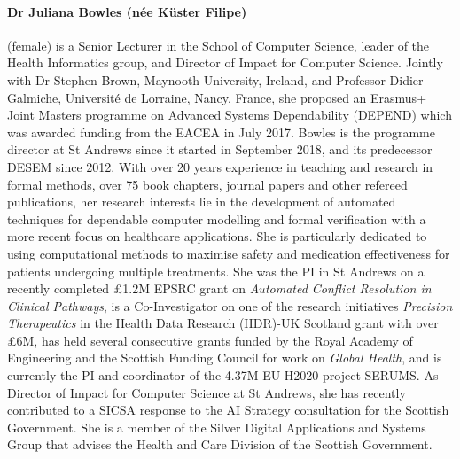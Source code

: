 \documentclass[a4paper,11pt]{article}
\begin{document}
\paragraph{Dr Juliana Bowles (n\'ee K\"uster Filipe)} (female) 
is  a Senior Lecturer in the School of Computer Science, leader of the Health Informatics group, and Director of Impact for Computer Science. 
Jointly with Dr Stephen Brown, Maynooth University, Ireland, and Professor Didier Galmiche, Universit\'e de Lorraine, Nancy, France, she proposed an Erasmus+ Joint Masters
programme on Advanced Systems Dependability (DEPEND) which was awarded funding from the EACEA in July 2017. Bowles is the programme director at St Andrews since it started in September 2018, and its predecessor DESEM since 2012.
With over 20 years experience in teaching and research in formal methods, over 75 book chapters, journal papers and other refereed publications, her research interests lie in the development of automated techniques for dependable computer modelling and formal verification with a more recent focus on healthcare applications. She is particularly dedicated to using computational methods to maximise safety and medication effectiveness for patients undergoing multiple treatments. She was the PI in St Andrews on a recently completed \pounds 1.2M EPSRC grant on \emph{Automated Conflict Resolution in Clinical Pathways}, is a Co-Investigator on one of the research initiatives \emph{Precision Therapeutics} in the Health Data Research (HDR)-UK Scotland grant with over \pounds 6M, has held several consecutive grants funded by the Royal Academy of Engineering and the Scottish Funding Council for work on \emph{Global Health}, and is currently the PI and coordinator of the \euros{} 4.37M EU H2020 project SERUMS. 
As Director of Impact for Computer Science at St Andrews, she has recently contributed to a SICSA response to the AI Strategy consultation for the Scottish Government. %
She is a member of the Silver Digital Applications and Systems Group that advises the Health and Care Division of the Scottish Government.

\end{document}
